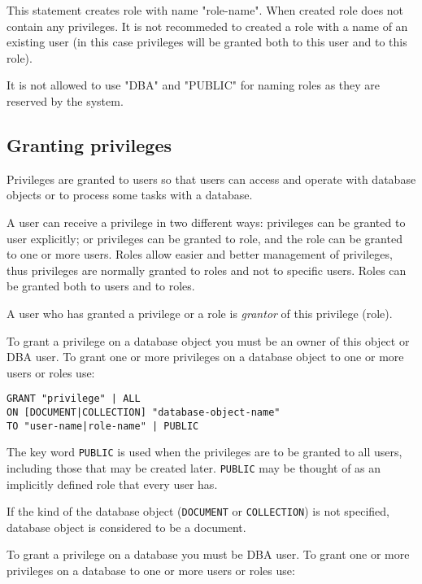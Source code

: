 \documentclass[a4paper,12pt]{article}
\begin{document}
This statement creates role with name "role-name". When created role does not contain any privileges. It is not recommeded to created a role with a name of an existing user (in this case privileges will be granted both to this user and to this role).

It is not allowed to use "DBA" and "PUBLIC" for naming roles as they are reserved by the system.

\subsection{Granting privileges}

Privileges are granted to users so that users can access and operate with database objects or to process some tasks with a database.

A user can receive a privilege in two different ways: privileges can be granted to user explicitly; or privileges can be granted to role, and the role can be granted to one or more users. Roles allow easier and better management of privileges, thus privileges are normally granted to roles and not to specific users. Roles can be granted both to users and to roles.

A user who has granted a privilege or a role is \emph{grantor} of this privilege (role).

To grant a privilege on a database object you must be an owner of this object or DBA user. To grant one or more privileges on a database object to one or more users or roles use:


\begin{verbatim}
GRANT "privilege" | ALL
ON [DOCUMENT|COLLECTION] "database-object-name" 
TO "user-name|role-name" | PUBLIC
\end{verbatim}

The key word \verb!PUBLIC! is used when the privileges are to be granted to all users, including those that may be created later. \verb!PUBLIC! may be thought of as an implicitly defined role that every user has.

If the kind of the database object (\verb!DOCUMENT! or \verb!COLLECTION!) is not specified, database object is considered to be a document.

To grant a privilege on a database you must be DBA user. To grant one or more privileges on a database to one or more users or roles use:
\end{document}
